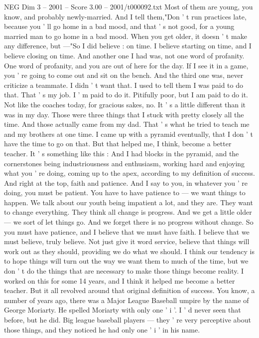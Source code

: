 \begin{textsample}{NEG Dim 3 – 2001 – Score 3.00 – 2001/t000092.txt}
Most of them are young, you know, and probably newly-married.
And I tell them,"Don ' t run practices late, because you ' ll go home in a bad mood, and that ' s not good, for a young married man to go home in a bad mood.
When you get older, it doesn ' t make any difference, but —"So I did believe : on time.
I believe starting on time, and I believe closing on time.
And another one I had was, not one word of profanity.
One word of profanity, and you are out of here for the day.
If I see it in a game, you ' re going to come out and sit on the bench.
And the third one was, never criticize a teammate.
I didn ' t want that.
I used to tell them I was paid to do that.
That ' s my job.
I ' m paid to do it.
Pitifully poor, but I am paid to do it.
Not like the coaches today, for gracious sakes, no.
It ' s a little different than it was in my day.
Those were three things that I stuck with pretty closely all the time.
And those actually came from my dad.
That ' s what he tried to teach me and my brothers at one time.
I came up with a pyramid eventually, that I don ' t have the time to go on that.
But that helped me, I think, become a better teacher.
It ' s something like this : And I had blocks in the pyramid, and the cornerstones being industriousness and enthusiasm, working hard and enjoying what you ' re doing, coming up to the apex, according to my definition of success.
And right at the top, faith and patience.
And I say to you, in whatever you ' re doing, you must be patient.
You have to have patience to — we want things to happen.
We talk about our youth being impatient a lot, and they are.
They want to change everything.
They think all change is progress.
And we get a little older — we sort of let things go.
And we forget there is no progress without change.
So you must have patience, and I believe that we must have faith.
I believe that we must believe, truly believe.
Not just give it word service, believe that things will work out as they should, providing we do what we should.
I think our tendency is to hope things will turn out the way we want them to much of the time, but we don ' t do the things that are necessary to make those things become reality.
I worked on this for some 14 years, and I think it helped me become a better teacher.
But it all revolved around that original definition of success.
You know, a number of years ago, there was a Major League Baseball umpire by the name of George Moriarty.
He spelled Moriarty with only one ' i '.
I ' d never seen that before, but he did.
Big league baseball players — they ' re very perceptive about those things, and they noticed he had only one ' i ' in his name.

\end{textsample}
